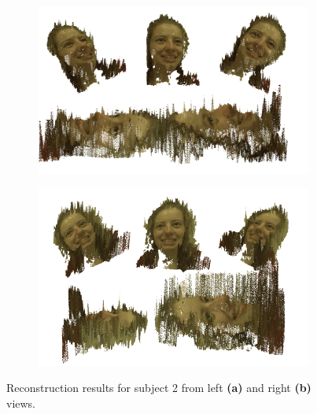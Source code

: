 \documentclass[journal]{IEEEtran}
\begin{document}
\begin{figure}[h]
    \centering
    \begin{subfigure}[t]{0.8\linewidth}
        \centering
        \includegraphics[width=\linewidth]{result_S2_R}
		\caption{}
		\label{fig:result_S2_R}
    \end{subfigure}
    
    \begin{subfigure}[t]{0.8\linewidth}
        \centering
		\includegraphics[width=\linewidth]{result_S2_L}
		\caption{}
		\label{fig:result_S2_L}
    \end{subfigure}
    \caption{Reconstruction results for subject 2 from left \textbf{(a)} and right \textbf{(b)} views.}
    \label{fig:results_S2-reconstruction}
\end{figure}
\end{document}
